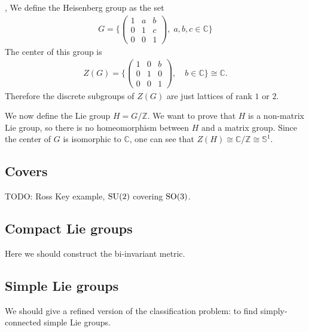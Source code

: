 \begin{definition}
\textup{\cite[10.2]{Fulton2004}, \cite[4.8]{Hall2015}}
We define the Heisenberg group as the set
\begin{align*}
G = \Bigg\{\begin{pmatrix}
1 &a &b\\
0 &1 &c\\
0 &0 &1
\end{pmatrix}, \; a,b,c \in \mathbb{C} \Bigg\}
\end{align*} 
The center of this group is 
\begin{align*}
Z(G) = \Bigg\{\begin{pmatrix}
1 &0 &b\\
0 &1 &0\\
0 &0 &1
\end{pmatrix}, \quad b \in \mathbb{C}\Bigg\} \cong \mathbb{C}.
\end{align*}
Therefore the discrete subgroups of $Z(G)$ are just lattices of rank $1$ or $2$.
\end{definition}
We now define the Lie group $H = G / \mathbb{Z}$. We want to prove that $H$ is a non-matrix Lie group, so there is no homeomorphism between $H$ and a matrix group. Since the center of $G$ is isomorphic to $\mathbb{C}$, one can see that $Z(H) \cong \mathbb{C} / \mathbb{Z} \cong \mathbb{S}^1$. 
\subsection{Covers}

TODO: Ross
Key example, $\mathrm{SU}(2)$ covering $\mathrm{SO}(3)$.


\subsection{Compact Lie groups}

Here we should construct the bi-invariant metric.


\subsection{Simple Lie groups}
We should give a refined version of the classification problem: to find simply-connected simple Lie groups.
